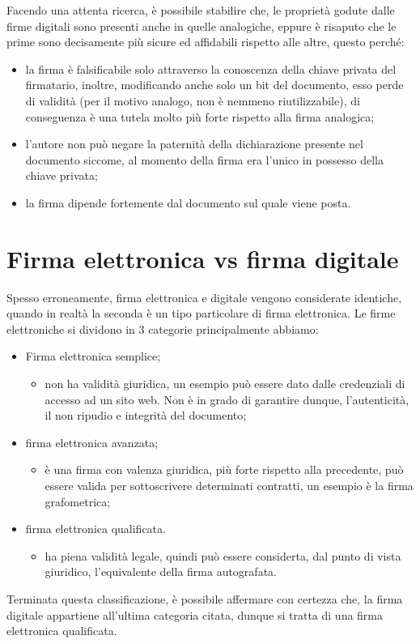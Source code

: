 Facendo una attenta ricerca, è possibile stabilire che, le proprietà godute dalle firme digitali sono presenti anche in quelle analogiche, eppure è risaputo che le prime sono decisamente più sicure ed affidabili rispetto alle altre, questo perché:
\begin{itemize}
	\item la firma è falsificabile solo attraverso la conoscenza della chiave privata del firmatario, inoltre, modificando anche solo un bit del documento, esso perde di validità (per il motivo analogo, non è nemmeno riutilizzabile), di conseguenza è una tutela molto più forte rispetto alla firma analogica;
	\item l'autore non può negare la paternità della dichiarazione presente nel documento siccome, al momento della firma era l'unico in possesso della chiave privata;
	\item la firma dipende fortemente dal documento sul quale viene posta.
\end{itemize}

\section{Firma elettronica vs firma digitale}

Spesso erroneamente, firma elettronica e digitale vengono considerate identiche, quando in realtà la seconda è un tipo particolare di firma elettronica.
Le firme elettroniche si dividono in 3 categorie principalmente abbiamo:

\begin{itemize}
	\item Firma elettronica semplice;
	\begin{itemize}
		\item non ha validità giuridica, un esempio può essere dato dalle credenziali di accesso ad un sito web. Non è in grado di garantire dunque, l'autenticità, il non ripudio e integrità del documento;
	\end{itemize}
	\item firma elettronica avanzata;
	\begin{itemize}
		\item è una firma con valenza giuridica, più forte rispetto alla precedente, può essere valida per sottoscrivere determinati contratti, un esempio è la firma grafometrica;
	\end{itemize}
	\item firma elettronica qualificata.
	\begin{itemize}
		\item ha piena validità legale, quindi può essere considerta, dal punto di vista giuridico, l'equivalente della firma autografata.
	\end{itemize}
\end{itemize}

Terminata questa classificazione, è possibile affermare con certezza che, la firma digitale appartiene all'ultima categoria citata, dunque si tratta di una firma elettronica qualificata.


